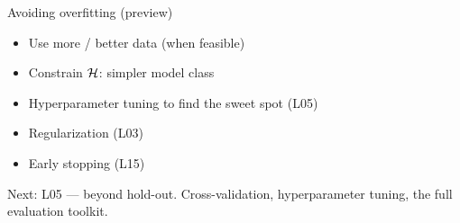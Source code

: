 \documentclass[aspectratio=169]{beamer}
\begin{document}
\begin{frame}{Avoiding overfitting (preview)}
  \begin{itemize}
    \item Use more / better data (when feasible)
    \item Constrain $\mathcal{H}$: simpler model class
    \item Hyperparameter tuning to find the sweet spot (L05)
    \item Regularization (L03)
    \item Early stopping (L15)
  \end{itemize}
  \vfill
  Next: L05 — beyond hold-out. Cross-validation, hyperparameter tuning, the full evaluation toolkit.
\end{frame}
\end{document}
